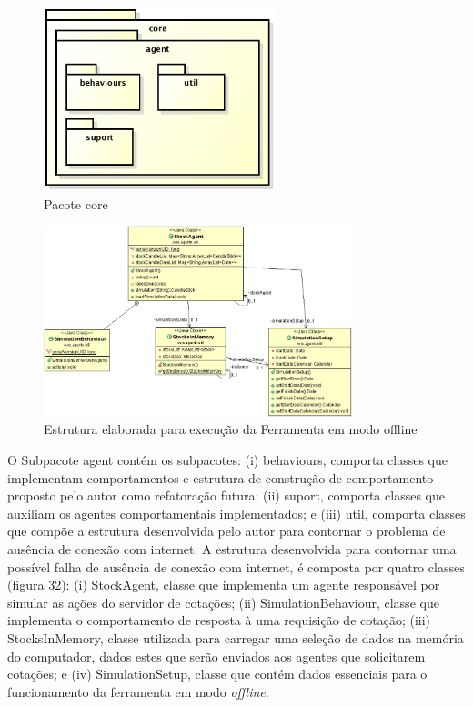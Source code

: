 \begin{figure}[h]
\centering
\label{f31}
\includegraphics[width=0.6\textwidth]{figuras/pacoteAgents}
\caption{Pacote core}
\end{figure}

\begin{figure}[h]
\centering
\label{f32}
\includegraphics[width=0.8\textwidth]{figuras/classesUtil}
\caption{Estrutura elaborada para execução da Ferramenta em modo offline}
\end{figure}

O Subpacote agent contém os subpacotes: (i) behaviours, comporta classes que implementam comportamentos e estrutura de construção de comportamento proposto pelo autor como refatoração futura; (ii) suport, comporta classes que auxiliam os agentes comportamentais implementados; e (iii) util, comporta classes que compõe a estrutura desenvolvida pelo autor para contornar o problema de ausência de conexão com internet. A estrutura desenvolvida para contornar uma possível falha de ausência de conexão com internet, é composta por quatro classes (figura 32): (i) StockAgent, classe que implementa um agente responsável por simular as ações do servidor de cotações; (ii) SimulationBehaviour, classe que implementa o comportamento de resposta à uma requisição de cotação; (iii) StocksInMemory, classe utilizada para carregar uma seleção de dados na memória do computador, dados estes que serão enviados aos agentes que solicitarem cotações; e (iv) SimulationSetup, classe que contém dados essenciais para o funcionamento da ferramenta em modo \textit{offline}.

